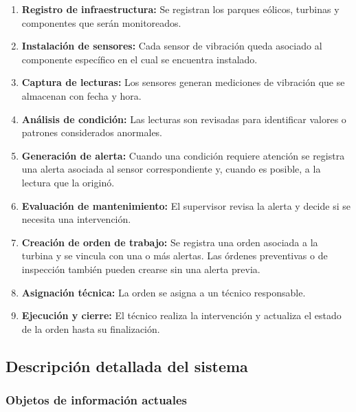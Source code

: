 \documentclass[11pt,a4paper]{article}
\begin{document}
\begin{enumerate}
    \item \textbf{Registro de infraestructura:} Se registran los parques eólicos,
    turbinas y componentes que serán monitoreados.

    \item \textbf{Instalación de sensores:} Cada sensor de vibración queda asociado al
    componente específico en el cual se encuentra instalado.

    \item \textbf{Captura de lecturas:} Los sensores generan mediciones de vibración
    que se almacenan con fecha y hora.

    \item \textbf{Análisis de condición:} Las lecturas son revisadas para identificar
    valores o patrones considerados anormales.

    \item \textbf{Generación de alerta:} Cuando una condición requiere atención se
    registra una alerta asociada al sensor correspondiente y, cuando es posible, a la
    lectura que la originó.

    \item \textbf{Evaluación de mantenimiento:} El supervisor revisa la alerta y
    decide si se necesita una intervención.

    \item \textbf{Creación de orden de trabajo:} Se registra una orden asociada a la
    turbina y se vincula con una o más alertas. Las órdenes preventivas o de
    inspección también pueden crearse sin una alerta previa.

    \item \textbf{Asignación técnica:} La orden se asigna a un técnico responsable.

    \item \textbf{Ejecución y cierre:} El técnico realiza la intervención y actualiza
    el estado de la orden hasta su finalización.
\end{enumerate}

\subsection{Descripción detallada del sistema}

\subsubsection{Objetos de información actuales}
\end{document}
